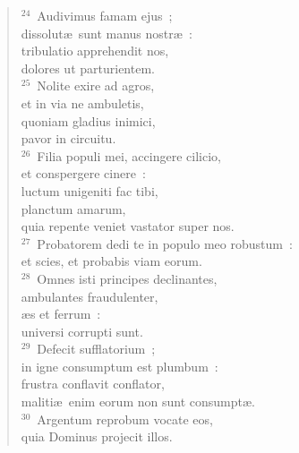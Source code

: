 \begin{verse}
${}^{24}$~Audivimus famam ejus~;\\ dissolut\ae\ sunt manus nostr\ae~:\\ tribulatio apprehendit nos,\\ dolores ut parturientem.\\
${}^{25}$~Nolite exire ad agros,\\ et in via ne ambuletis,\\ quoniam gladius inimici,\\ pavor in circuitu.\\
${}^{26}$~Filia populi mei, accingere cilicio,\\ et conspergere cinere~:\\ luctum unigeniti fac tibi,\\ planctum amarum,\\ quia repente veniet vastator super nos.\\
${}^{27}$~Probatorem dedi te in populo meo robustum~:\\ et scies, et probabis viam eorum.\\
${}^{28}$~Omnes isti principes declinantes,\\ ambulantes fraudulenter,\\ \ae s et ferrum~:\\ universi corrupti sunt.\\
${}^{29}$~Defecit sufflatorium~;\\ in igne consumptum est plumbum~:\\ frustra conflavit conflator,\\ maliti\ae\ enim eorum non sunt consumpt\ae .\\
${}^{30}$~Argentum reprobum vocate eos,\\ quia Dominus projecit illos.\end{verse}



